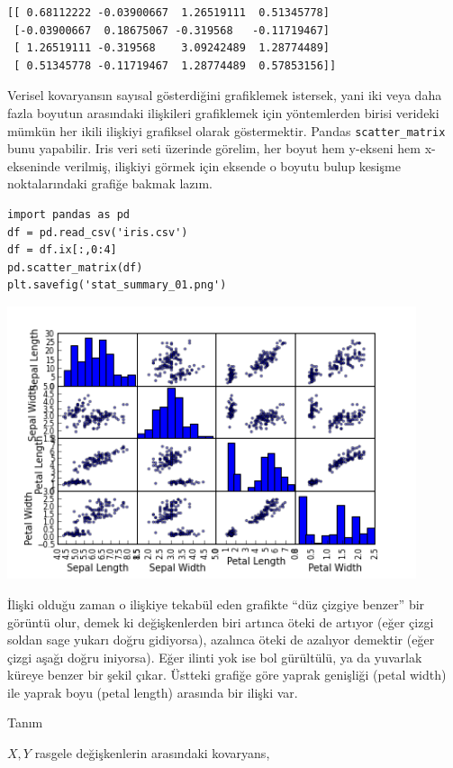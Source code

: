 \documentclass[12pt,fleqn]{article}\usepackage{../../common}
\begin{document}
\begin{verbatim}
[[ 0.68112222 -0.03900667  1.26519111  0.51345778]
 [-0.03900667  0.18675067 -0.319568   -0.11719467]
 [ 1.26519111 -0.319568    3.09242489  1.28774489]
 [ 0.51345778 -0.11719467  1.28774489  0.57853156]]
\end{verbatim}

Verisel kovaryansın sayısal gösterdiğini grafiklemek istersek, yani iki
veya daha fazla boyutun arasındaki ilişkileri grafiklemek için yöntemlerden
birisi verideki mümkün her ikili ilişkiyi grafiksel olarak
göstermektir. Pandas \verb!scatter_matrix! bunu yapabilir. Iris veri seti
üzerinde görelim, her boyut hem y-ekseni hem x-ekseninde verilmiş, ilişkiyi
görmek için eksende o boyutu bulup kesişme noktalarındaki grafiğe bakmak
lazım.

\begin{verbatim}
import pandas as pd
df = pd.read_csv('iris.csv')
df = df.ix[:,0:4]
pd.scatter_matrix(df)
plt.savefig('stat_summary_01.png')
\end{verbatim}

\includegraphics[height=8cm]{stat_cov_corr_01.png}

İlişki olduğu zaman o ilişkiye tekabül eden grafikte ``düz çizgiye benzer''
bir görüntü olur, demek ki değişkenlerden biri artınca öteki de artıyor
(eğer çizgi soldan sage yukarı doğru gidiyorsa), azalınca öteki de azalıyor
demektir (eğer çizgi aşağı doğru iniyorsa). Eğer ilinti yok ise bol
gürültülü, ya da yuvarlak küreye benzer bir şekil çıkar. Üstteki grafiğe
göre yaprak genişliği (petal width) ile yaprak boyu (petal length) arasında
bir ilişki var.

Tanım

$X,Y$ rasgele değişkenlerin arasındaki kovaryans,
\end{document}
